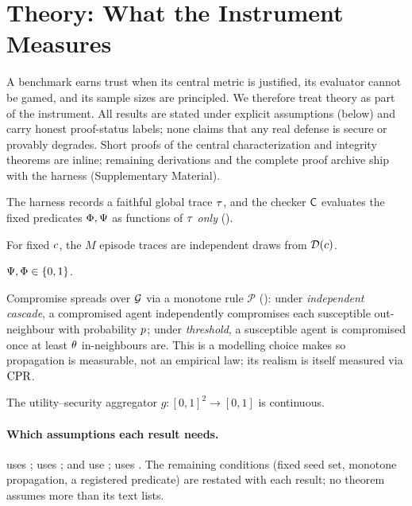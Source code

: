 \section{Theory: What the Instrument Measures}
\label{sec:theory}

A benchmark earns trust when its central metric is justified, its evaluator cannot be
gamed, and its sample sizes are principled. We therefore treat theory as part of the
instrument. All results are stated under explicit assumptions (below) and carry honest
proof-status labels; none claims that any real defense is secure or provably degrades.
Short proofs of the central characterization and integrity theorems are inline; remaining
derivations and the complete proof archive ship with the harness (Supplementary Material).

\begin{assumption}
\label{as:tcb}
The harness records a faithful global trace $\tau$, and the checker $\mathsf{C}$
evaluates the fixed predicates $\Phi,\Psi$ as functions of $\tau$ \emph{only}
().
\end{assumption}
\begin{assumption}[i.i.d.\ episodes]
\label{as:iid}
For fixed $c$, the $M$ episode traces are independent draws from
$\mathcal{D}(c)$.
\end{assumption}
\begin{assumption}
\label{as:bounded}
$\Psi,\Phi\in\{0,1\}$.
\end{assumption}
\begin{assumption}
\label{as:prop}
Compromise spreads over $\mathcal{G}$ via a monotone rule $\mathcal{P}$ ():
under \emph{independent cascade}, a compromised agent independently compromises each
susceptible out-neighbour with probability $p$; under \emph{threshold}, a susceptible
agent is compromised once at least $\theta$ in-neighbours are. This is a modelling choice
 makes so propagation is measurable, not an empirical law; its realism is itself
measured via $\mathrm{CPR}$.
\end{assumption}
\begin{assumption}
\label{as:cont}
The utility--security aggregator $g:[0,1]^2\to[0,1]$ is continuous.
\end{assumption}

\paragraph{Which assumptions each result needs.}
 uses ;  uses ;
 and  use ; 
uses . The remaining conditions (fixed seed set, monotone
propagation, a registered predicate) are restated with each result; no theorem assumes
more than its text lists.

